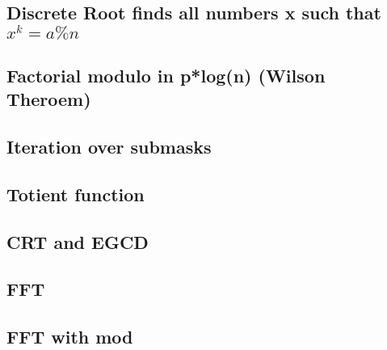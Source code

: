 \subsection{Discrete Root finds all numbers x such that ${x^k = a \% n}$}
\vspace{-2ex}
\raggedbottom
\vspace{-3.2ex}
\hrulefill
\subsection{Factorial modulo in p*log(n) (Wilson Theroem)}
\vspace{-2ex}
\raggedbottom
\vspace{-3.2ex}
\hrulefill
\subsection{Iteration over submasks}
\vspace{-2ex}
\raggedbottom
\vspace{-3.2ex}
\hrulefill
\subsection{Totient function}
\vspace{-2ex}
\raggedbottom
\vspace{-3.2ex}
\hrulefill
\subsection{CRT and EGCD}
\vspace{-2ex}
\raggedbottom
\vspace{-3.2ex}
\hrulefill
\subsection{FFT}
\vspace{-2ex}
\raggedbottom
\vspace{-3.2ex}
\hrulefill
\subsection{FFT with mod}
\vspace{-2ex}
\raggedbottom
\vspace{-3.2ex}
\hrulefill

